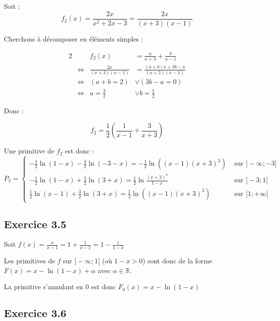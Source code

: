 \documentclass[a4paper,10pt]{report}
\begin{document}
Soit :
\begin{equation*}
		f_2(x) =\frac{2x}{x^2 + 2x -3} = \frac{2x}{(x+3)(x-1)}
\end{equation*}

Cherchons à décomposer en éléments simples :

\begin{alignat*}{2}
	&                     &                f_2(x)  &= \frac{a}{x+3} +  \frac{b}{x-1}\\
	& \Longleftrightarrow & \frac{2x}{(x+3)(x-1)}  &=  \frac{(a+b)x + 3b -a}{(x+3)(x-1)} \\
	& \Longleftrightarrow & (a+b=2)               &\vee (3b-a = 0) \\
	& \Longleftrightarrow & a=\frac{3}{2}        &\vee b = \frac{1}{2}
\end{alignat*}

Donc :

\begin{displaymath}
	f_2 = \frac{1}{2} \left( \frac{1}{x-1} + \frac{3}{x+3} \right)
\end{displaymath}

Une primitive de $f_2$ est donc :
\begin{displaymath}
	P_2 = 
	\begin{cases}
		-\frac{1}{2}\ln(1-x) -\frac{3}{2}\ln(-3-x) = -\frac{1}{2} \ln((x-1)(x+3)^3)      & \text{ sur } ]-\infty ; -3]\\
		-\frac{1}{2}\ln(1-x) +\frac{3}{2}\ln(3+x)  = \frac{1}{2} \ln \frac{(x+3)^3}{1-x} & \text{ sur } ]-3 ; 1[\\
		\frac{1}{2}\ln(x-1) +\frac{3}{2}\ln(3+x)   = \frac{1}{2} \ln((x-1)(x+3)^3)       & \text{ sur } ]1 ; +\infty[
	\end{cases}
\end{displaymath}

\subsection*{Exercice 3.5}

Soit $f(x) = \frac{x}{x-1} = 1 + \frac{1}{x-1} = 1 - \frac{1}{1-x}$

Les primitives de $f$ sur $]-\infty; 1[$ (où $1-x>0$) sont donc de la forme $F(x) = x - \ln(1-x) + \alpha$ avec $\alpha \in \mathbb{R}$.

La primitive s'annulant en $0$ est donc $F_0(x) = x - \ln(1-x)$


\subsection*{Exercice 3.6}
\end{document}
